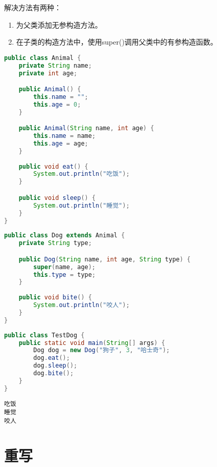 解决方法有两种：

\begin{enumerate}
	\item 为父类添加无参构造方法。
	\item 在子类的构造方法中，使用super()调用父类中的有参构造函数。
\end{enumerate}


\begin{lstlisting}[language=Java, title=Animal.java]
public class Animal {
    private String name;
    private int age;

    public Animal() {
        this.name = "";
        this.age = 0;
    }

    public Animal(String name, int age) {
        this.name = name;
        this.age = age;
    }
    
    public void eat() {
        System.out.println("吃饭");
    }

    public void sleep() {
        System.out.println("睡觉");
    }
}
\end{lstlisting}

\begin{lstlisting}[language=Java, title=Dog.java]
public class Dog extends Animal {
    private String type;

    public Dog(String name, int age, String type) {
        super(name, age);
        this.type = type;
    }
    
    public void bite() {
        System.out.println("咬人");
    }
}
\end{lstlisting}

\begin{lstlisting}[language=Java, title=TestDog.java]
public class TestDog {
    public static void main(String[] args) {
        Dog dog = new Dog("狗子", 3, "哈士奇");
        dog.eat();
        dog.sleep();
        dog.bite();
    }
}
\end{lstlisting}

\begin{tcolorbox}
	\begin{verbatim}
吃饭
睡觉
咬人
	\end{verbatim}
\end{tcolorbox}

\newpage

\section{重写}

